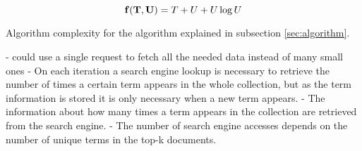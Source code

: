\begin{cequation}[H]
	\begin{equation}
		\mathbf{f(T, U)} = T + U + U\log{}U \\
	\end{equation}
  \caption{Algorithm complexity for the algorithm explained in subsection \ref{sec:algorithm}.}
  \label{eq:algorithm-complexity}
\end{cequation}







- could use a single request to fetch all the needed data instead of many small ones
- On each iteration a search engine lookup is necessary to retrieve the number of times a certain term appears in the whole collection,
but as the term information is stored it is only necessary when a new term appears.
- The information about how many times a term appears in the collection are retrieved from the search engine.
- The number of search engine accesses depends on the number of unique terms in the top-k documents.
